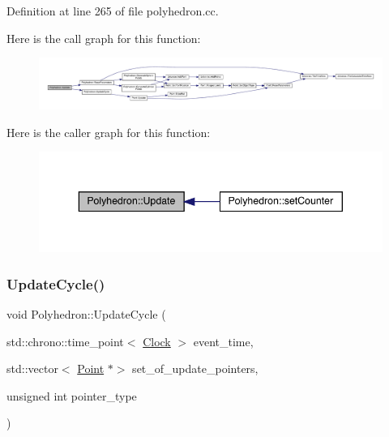 Definition at line 265 of file polyhedron.\+cc.

Here is the call graph for this function\+:
\nopagebreak
\begin{figure}[H]
\begin{center}
\leavevmode
\includegraphics[width=350pt]{class_polyhedron_a5fdc8c91719799904b8a1ccef535a42c_cgraph}
\end{center}
\end{figure}
Here is the caller graph for this function\+:
\nopagebreak
\begin{figure}[H]
\begin{center}
\leavevmode
\includegraphics[width=343pt]{class_polyhedron_a5fdc8c91719799904b8a1ccef535a42c_icgraph}
\end{center}
\end{figure}
\mbox{\label{class_polyhedron_a6b26174513703bc2b13f69b9cd8e1a48}} 
\subsubsection{\texorpdfstring{Update\+Cycle()}{UpdateCycle()}}
{\footnotesize\ttfamily void Polyhedron\+::\+Update\+Cycle (\begin{DoxyParamCaption}\item[{std\+::chrono\+::time\+\_\+point$<$ \hyperlink{universe_8h_a0ef8d951d1ca5ab3cfaf7ab4c7a6fd80}{Clock} $>$}]{event\+\_\+time,  }\item[{std\+::vector$<$ \hyperlink{class_point}{Point} $\ast$$>$}]{set\+\_\+of\+\_\+update\+\_\+pointers,  }\item[{unsigned int}]{pointer\+\_\+type }\end{DoxyParamCaption})}



